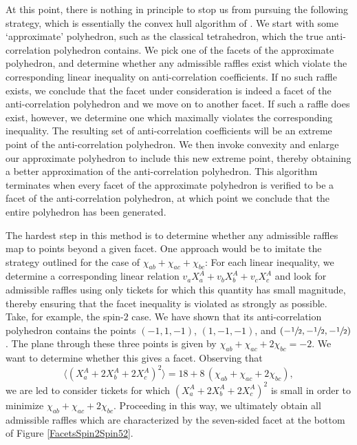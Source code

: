 At this point, there is nothing in principle to stop us from pursuing the following strategy, which is essentially the convex hull algorithm of \citet{Lassez and Lassez 1992}. We start with some `approximate' polyhedron, such as the classical tetrahedron, which the true anti-correlation polyhedron contains. We pick one of the facets of the approximate polyhedron, and determine whether any admissible raffles exist which violate the corresponding linear inequality on anti-correlation coefficients. If no such raffle exists, we conclude that the facet under consideration is indeed a facet of the anti-correlation polyhedron and we move on to another facet. If such a raffle does exist, however, we determine one which maximally violates the corresponding inequality. The resulting set of anti-correlation coefficients will be an extreme point of the anti-correlation polyhedron. We then invoke convexity and enlarge our approximate polyhedron to include this new extreme point, thereby obtaining a better approximation of the anti-correlation polyhedron. This algorithm terminates when every facet of the approximate polyhedron is verified to be a facet of the anti-correlation polyhedron, at which point we conclude that the entire polyhedron has been generated.

The hardest step in this method is to determine whether any admissible raffles map to points beyond a given facet. One approach would be to imitate the strategy outlined for the case of $\chi_{ab}+\chi_{ac}+\chi_{bc}$: For each linear inequality, we determine a corresponding linear relation $v_a X_a^A+v_b X_b^A+v_c X_c^A$ and look for admissible raffles using only tickets for which this quantity has small magnitude, thereby ensuring that the facet inequality is violated as strongly as possible. Take, for example, the spin-$2$ case. We have shown that its anti-correlation polyhedron contains the points  $(-1,1,-1)$, $(1,-1,-1)$, and $(-\sfrac12,-\sfrac12,-\sfrac12)$. The plane through these three points is given by $\chi_{ab}+\chi_{ac}+2\chi_{bc}=-2$. We want to determine whether this gives a facet. Observing that 
\begin{equation}
\big\langle \left(X_a^A+2X_b^A+2X_c^A\right)^2\big\rangle  = 18+8 \, (\chi_{ab}+\chi_{ac}+2\chi_{bc}),
\end{equation}
we are led to consider tickets for which $(X_a^A+2X_b^A+2X_c^A)^2$ is small in order to minimize $\chi_{ab}+\chi_{ac}+2\chi_{bc}$. Proceeding in this way, we ultimately obtain all admissible raffles which are characterized by the seven-sided facet at the bottom of Figure \ref{FacetsSpin2Spin52}.

